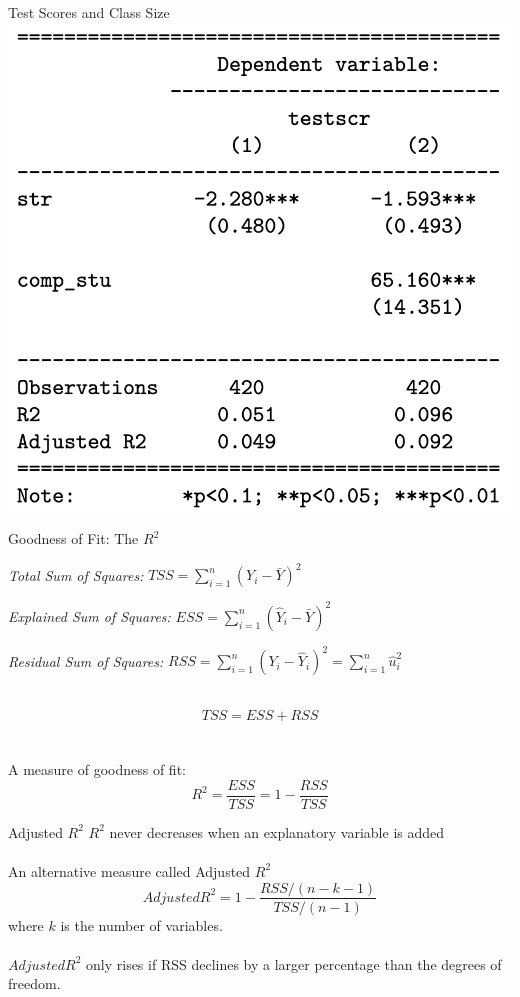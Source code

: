 \documentclass{./../div_teaching_slides}
\begin{document}
\begin{frame}{Test Scores and Class Size}
\vspace{-0.5em}
\centering
\includegraphics[scale=0.3]{reg_output_stargazer2.png}
\end{frame}

\begin{frame}{Goodness of Fit: The $R^2$}
\begin{witemize}
\item[]   \textit{Total Sum of Squares:} $TSS = \sum_{i=1}^n (Y_i-\bar{Y})^2 $
\item[]  \textit{Explained Sum of Squares:} $  ESS = \sum_{i=1}^n (\hat{Y}_i-\bar{Y})^2 $
\item[]   \textit{Residual Sum of Squares:} $  RSS = \sum_{i=1}^n (Y_i-\hat{Y}_i)^2 =\sum_{i=1}^n \hat{u}_i^2$ \\~\\
\end{witemize}
$$ TSS = ESS + RSS $$ \\~\\
A measure of goodness of fit: 
$$ R^2 = \frac{ESS}{TSS} = 1-\frac{RSS}{TSS} $$
\end{frame}

\begin{frame}{Adjusted $R^2$}
$R^2$ never decreases when an explanatory variable is added \\~\\
An alternative measure called Adjusted $R^2$ 
$$ Adjusted R^2 = 1-\frac{RSS/(n-k-1)}{TSS/(n-1)} $$ 
where $k$ is the number of variables. \\~\\
$Adjusted R^2$ only rises if RSS declines by a larger percentage than the degrees
of freedom.
\end{frame}
\end{document}
